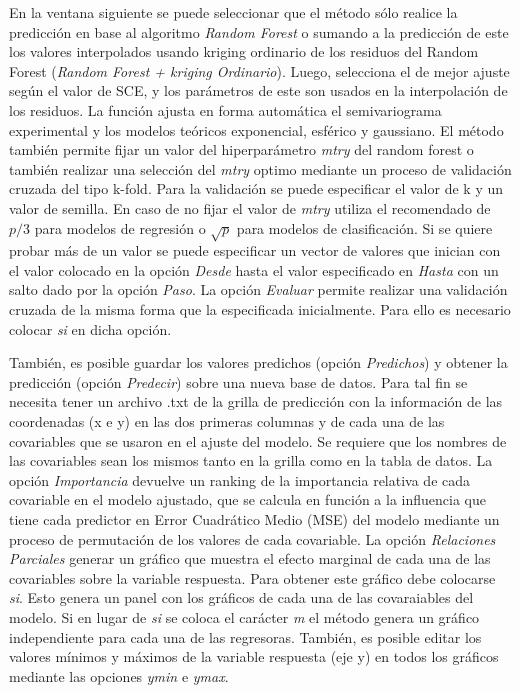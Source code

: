 \documentclass[11pt,b5paper,]{krantz}
\begin{document}
En la ventana siguiente se puede seleccionar que el método sólo realice
la predicción en base al algoritmo \emph{Random Forest} o sumando a la
predicción de este los valores interpolados usando kriging ordinario de
los residuos del Random Forest (\emph{Random Forest + kriging
Ordinario}). Luego, selecciona el de mejor ajuste según el valor de SCE,
y los parámetros de este son usados en la interpolación de los residuos.
La función ajusta en forma automática el semivariograma experimental y
los modelos teóricos exponencial, esférico y gaussiano. El método
también permite fijar un valor del hiperparámetro \emph{mtry} del random
forest o también realizar una selección del \emph{mtry} optimo mediante
un proceso de validación cruzada del tipo k-fold. Para la validación se
puede especificar el valor de k y un valor de semilla. En caso de no
fijar el valor de \emph{mtry} utiliza el recomendado de \(p/3\) para
modelos de regresión o \(\sqrt{p}\) para modelos de clasificación. Si se
quiere probar más de un valor se puede especificar un vector de valores
que inician con el valor colocado en la opción \emph{Desde} hasta el
valor especificado en \emph{Hasta} con un salto dado por la opción
\emph{Paso}. La opción \emph{Evaluar} permite realizar una validación
cruzada de la misma forma que la especificada inicialmente. Para ello es
necesario colocar \emph{si} en dicha opción.

También, es posible guardar los valores predichos (opción
\emph{Predichos}) y obtener la predicción (opción \emph{Predecir}) sobre
una nueva base de datos. Para tal fin se necesita tener un archivo .txt
de la grilla de predicción con la información de las coordenadas (x e y)
en las dos primeras columnas y de cada una de las covariables que se
usaron en el ajuste del modelo. Se requiere que los nombres de las
covariables sean los mismos tanto en la grilla como en la tabla de
datos. La opción \emph{Importancia} devuelve un ranking de la
importancia relativa de cada covariable en el modelo ajustado, que se
calcula en función a la influencia que tiene cada predictor en Error
Cuadrático Medio (MSE) del modelo mediante un proceso de permutación de
los valores de cada covariable. La opción \emph{Relaciones Parciales}
generar un gráfico que muestra el efecto marginal de cada una de las
covariables sobre la variable respuesta. Para obtener este gráfico debe
colocarse \emph{si}. Esto genera un panel con los gráficos de cada una
de las covaraiables del modelo. Si en lugar de \emph{si} se coloca el
carácter \emph{m} el método genera un gráfico independiente para cada
una de las regresoras. También, es posible editar los valores mínimos y
máximos de la variable respuesta (eje y) en todos los gráficos mediante
las opciones \emph{ymin} e \emph{ymax}.
\end{document}
